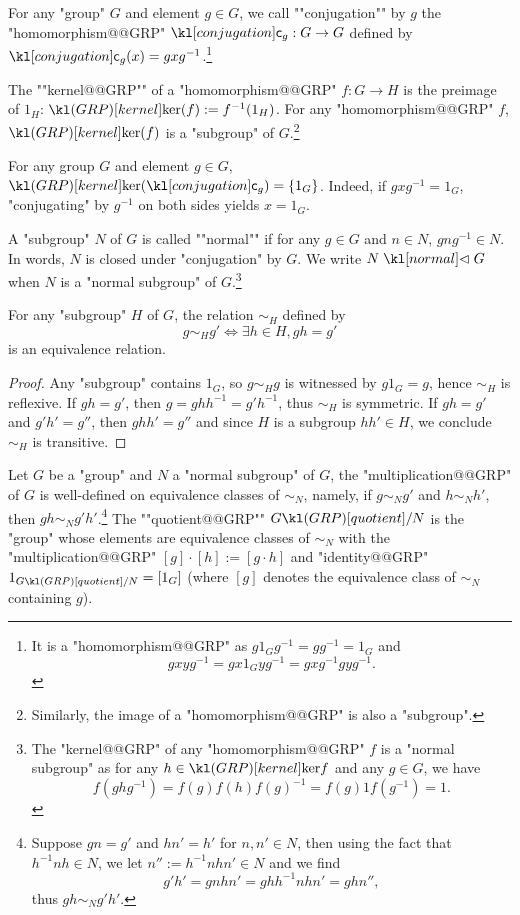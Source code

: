 \documentclass[main.tex]{subfiles}
\begin{document}
\begin{exmp}
	\AP For any "group" $G$ and element $g \in G$, we call ""conjugation"" by $g$ the "homomorphism@@GRP" $\conjug{g}: G \rightarrow G$ defined by $\conjug{g}(x) = gxg^{-1}$.\footnote{It is a "homomorphism@@GRP" as $g1_Gg^{-1} = gg^{-1} = 1_G$ and \[gxyg^{-1} = gx1_Gyg^{-1} = gxg^{-1}gyg^{-1}.\]}
\end{exmp}
\begin{defn}[Kernel]
    \AP The ""kernel@@GRP"" of a "homomorphism@@GRP" $f: G \rightarrow H$ is the preimage of $1_H$: $\kergrp(f) := f^{-1}(1_H)$. For any "homomorphism@@GRP" $f$, $\kergrp(f)$ is a "subgroup" of $G$.\footnote{Similarly, the image of a "homomorphism@@GRP" is also a "subgroup".}
\end{defn}
\begin{exmp}
	For any group $G$ and element $g \in G$, $\kergrp(\conjug{g}) = \{1_G\}$. Indeed, if $gxg^{-1} = 1_G$, "conjugating" by $g^{-1}$ on both sides yields $x = 1_G$.
\end{exmp}
\begin{defn}
	\AP A "subgroup" $N$ of $G$ is called ""normal"" if for any $g \in G$ and $n \in N$, $gng^{-1} \in N$. In words, $N$ is closed under "conjugation" by $G$. We write $N \nsub G$ when $N$ is a "normal subgroup" of $G$.\footnote{The "kernel@@GRP" of any "homomorphism@@GRP" $f$ is a "normal subgroup" as for any $h \in \kergrp{f}$ and any $g \in G$, we have
	\[f(ghg^{-1}) = f(g)f(h)f(g)^{-1} = f(g)1f(g^{-1}) = 1.\]}
\end{defn}
\begin{prop}\label{prop:equivcoset}
	For any "subgroup" $H$ of $G$, the relation $\sim_H$ defined by \[g \sim_H g' \Leftrightarrow \exists h \in H, gh = g'\]
	is an equivalence relation.
\end{prop}
\begin{proof}
	Any "subgroup" contains $1_G$, so $g \sim_H g$ is witnessed by $g1_G = g$, hence $\sim_H$ is reflexive. If $gh = g'$, then $g = ghh^{-1} = g'h^{-1}$, thus $\sim_H$ is symmetric. If $gh = g'$ and $g'h' = g''$, then $ghh' = g''$ and since $H$ is a subgroup $hh' \in H$, we conclude $\sim_H$ is transitive.
\end{proof}
\begin{defn}[Quotient]
	Let $G$ be a "group" and $N$ a "normal subgroup" of $G$, the "multiplication@@GRP" of $G$ is well-defined on equivalence classes of $\sim_N$, namely, if $g \sim_N g'$ and $h \sim_N h'$, then $gh \sim_N g'h'$.\footnote{Suppose $gn = g'$ and $hn'= h'$ for $n,n' \in N$, then using the fact that $h^{-1}nh \in N$, we let $n'' := h^{-1}nhn' \in N$ and we find
	\[g'h' = gnhn' = ghh^{-1}nhn' = ghn'',\]
	thus $gh \sim_N g'h'$.} \AP The ""quotient@@GRP"" $\quotGRP{G}{N}$ is the "group" whose elements are equivalence classes of $\sim_N$ with the "multiplication@@GRP" $[g]\cdot [h] := [g\cdot h]$ and "identity@@GRP" $1_{\quotGRP{G}{N}} = [1_G]$ (where $[g]$ denotes the equivalence class of $\sim_N$ containing $g$). 
\end{defn}
\end{document}
